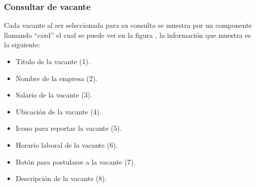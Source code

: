 \subsubsection{Consultar de vacante}
Cada vacante al ser seleccionada para su consulta se muestra por un componente llamando ``card'' el cual se puede ver en la figura , la información que 
muestra es la siguiente: 
\begin{itemize}
   \item Titulo de la vacante (1).
   \item Nombre de la empresa (2).
   \item Salario de la vacante (3).
   \item Ubicación de la vacante (4).
   \item Icono para reportar la vacante (5).
   \item Horario laboral de la vacante (6).
   \item Botón para postularse a la vacante (7).
   \item Descripción de la vacante (8).
\end{itemize}





